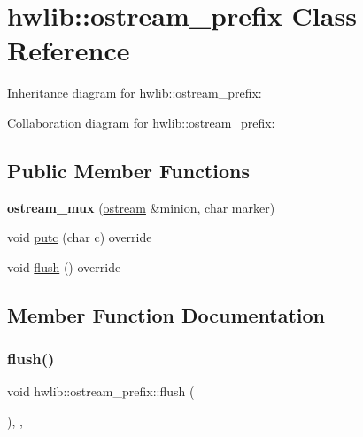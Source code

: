 \hypertarget{classhwlib_1_1ostream__prefix}{}\section{hwlib\+:\+:ostream\+\_\+prefix Class Reference}
\label{classhwlib_1_1ostream__prefix}


Inheritance diagram for hwlib\+:\+:ostream\+\_\+prefix\+:


Collaboration diagram for hwlib\+:\+:ostream\+\_\+prefix\+:
\subsection*{Public Member Functions}
\begin{DoxyCompactItemize}
\item 
\mbox{\label{classhwlib_1_1ostream__prefix_a4a3456480e720c15769c1604fb9c9b6e}} 
{\bfseries ostream\+\_\+mux} (\hyperlink{classhwlib_1_1ostream}{ostream} \&minion, char marker)
\item 
void \hyperlink{classhwlib_1_1ostream__prefix_a9a3bc3759d39b0d93202ff4aaacda270}{putc} (char c) override
\item 
void \hyperlink{classhwlib_1_1ostream__prefix_a1e7f7655a749a24d81aafdc4ef93ac30}{flush} () override
\end{DoxyCompactItemize}


\subsection{Member Function Documentation}
\mbox{\label{classhwlib_1_1ostream__prefix_a1e7f7655a749a24d81aafdc4ef93ac30}} 
\subsubsection{\texorpdfstring{flush()}{flush()}}
{\footnotesize\ttfamily void hwlib\+::ostream\+\_\+prefix\+::flush (\begin{DoxyParamCaption}{ }\end{DoxyParamCaption})\hspace{0.3cm}{\ttfamily [inline]}, {\ttfamily [override]}, {\ttfamily [virtual]}}

